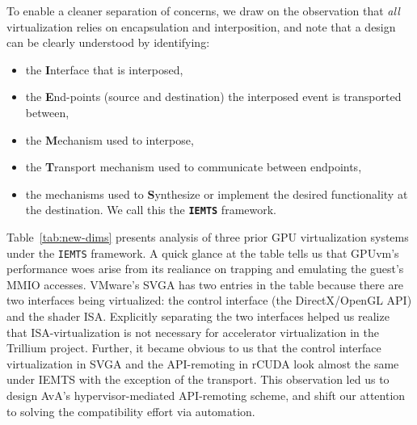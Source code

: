 To enable a cleaner separation of concerns, we draw on the observation that
\textit{all} virtualization relies on encapsulation and interposition, and
note that a design can be clearly understood by identifying:
\begin{itemize}[nosep, topsep=0em, leftmargin=1em,labelwidth=*,align=left]
\item the \textbf{I}nterface that is interposed,
\item the \textbf{E}nd-points (source and destination) the interposed event is
transported between,
\item the \textbf{M}echanism used to interpose,
\item the \textbf{T}ransport mechanism used to communicate between endpoints,
\item the mechanisms used to \textbf{S}ynthesize or implement the desired
functionality at the destination. We call this the \textbf{\texttt{IEMTS}} framework.
\end{itemize}

Table~\ref{tab:new-dims} presents analysis of three prior GPU virtualization
systems under the \texttt{IEMTS} framework. A quick glance at the table
tells us that GPUvm's~\cite{suzuki2014gpuvm} performance woes arise from its
realiance on trapping and emulating the guest's MMIO accesses. VMware's SVGA
has two entries in the table because there are two interfaces being
virtualized: the control interface (the DirectX/OpenGL API) and the shader ISA.
Explicitly separating the two interfaces helped us realize that
ISA-virtualization is not necessary for accelerator virtualization in the
Trillium project. Further, it became obvious to us that the control interface
virtualization in SVGA and the API-remoting in rCUDA look almost the same
under IEMTS with the exception of the transport. This observation led us
to design AvA's hypervisor-mediated API-remoting scheme, and shift our
attention to solving the compatibility effort via automation.